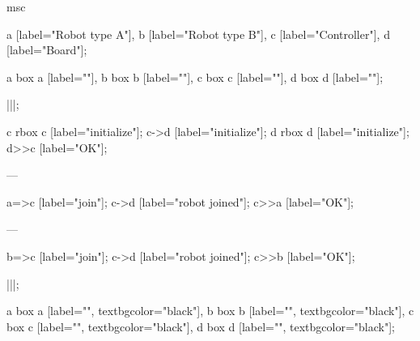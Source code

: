 \begin{msc}
msc
{

a [label="Robot type A"],
b [label="Robot type B"],
c [label="Controller"],
d [label="Board"];

a box a [label=""],
b box b [label=""],
c box c [label=""],
d box d [label=""];

|||;

c rbox c [label="initialize"];
c->d [label="initialize"];
d rbox d [label="initialize"];
d>>c [label="OK"];

---

a=>c [label="join"];
c->d [label="robot joined"];
c>>a [label="OK"];

---

b=>c [label="join"];
c->d [label="robot joined"];
c>>b [label="OK"];

|||;

a box a [label="", textbgcolor="black"],
b box b [label="", textbgcolor="black"],
c box c [label="", textbgcolor="black"],
d box d [label="", textbgcolor="black"];

}
\end{msc}